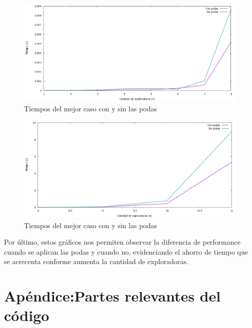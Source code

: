 \documentclass[10pt, a4paper]{article}
\begin{document}
	\begin{figure}[H]
  		\centering
   	 	\includegraphics[width=1\textwidth]
   	 	{Imagenes/exploradorasPodasChico.png}
		\caption{Tiempos del mejor caso con y sin las podas}
	\end{figure}	
	\begin{figure}[H]
  		\centering
   	 	\includegraphics[width=1\textwidth]
   	 	{Imagenes/exploradorasPodas.png}
		\caption{Tiempos del mejor caso con y sin las podas}
	\end{figure}
	
	Por último, estos gráficos nos permiten observar la diferencia de performance cuando se aplican las podas y cuando no, evidenciando el ahorro de tiempo que se acrecenta conforme aumenta la cantidad de exploradoras.
	
\section{Apéndice:Partes relevantes del código}
\end{document}
